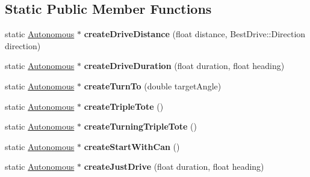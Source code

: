 \subsection*{Static Public Member Functions}
\begin{DoxyCompactItemize}
\item 
\hypertarget{class_autonomous_a6391f5e216f820029437e351bb84ae7c}{}static \hyperlink{class_autonomous}{Autonomous} $\ast$ {\bfseries create\+Drive\+Distance} (float distance, Best\+Drive\+::\+Direction direction)\label{class_autonomous_a6391f5e216f820029437e351bb84ae7c}

\item 
\hypertarget{class_autonomous_a500383605a081ceed65af68d7be3345d}{}static \hyperlink{class_autonomous}{Autonomous} $\ast$ {\bfseries create\+Drive\+Duration} (float duration, float heading)\label{class_autonomous_a500383605a081ceed65af68d7be3345d}

\item 
\hypertarget{class_autonomous_a43817961cc483af7d727a19dbb997484}{}static \hyperlink{class_autonomous}{Autonomous} $\ast$ {\bfseries create\+Turn\+To} (double target\+Angle)\label{class_autonomous_a43817961cc483af7d727a19dbb997484}

\item 
\hypertarget{class_autonomous_a1bdfb3fe31bc2ab0380a864782dc879d}{}static \hyperlink{class_autonomous}{Autonomous} $\ast$ {\bfseries create\+Triple\+Tote} ()\label{class_autonomous_a1bdfb3fe31bc2ab0380a864782dc879d}

\item 
\hypertarget{class_autonomous_af17ae791956f3bc069cdf89f197ecfc0}{}static \hyperlink{class_autonomous}{Autonomous} $\ast$ {\bfseries create\+Turning\+Triple\+Tote} ()\label{class_autonomous_af17ae791956f3bc069cdf89f197ecfc0}

\item 
\hypertarget{class_autonomous_ac8b0ffd5e3720924016111dc78491152}{}static \hyperlink{class_autonomous}{Autonomous} $\ast$ {\bfseries create\+Start\+With\+Can} ()\label{class_autonomous_ac8b0ffd5e3720924016111dc78491152}

\item 
\hypertarget{class_autonomous_addc31f8d169e7351eea7433cfea69cc8}{}static \hyperlink{class_autonomous}{Autonomous} $\ast$ {\bfseries create\+Just\+Drive} (float duration, float heading)\label{class_autonomous_addc31f8d169e7351eea7433cfea69cc8}

\end{DoxyCompactItemize}


